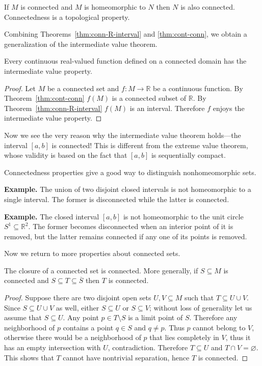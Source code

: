 \begin{cor}
  If $M$ is connected and $M$ is homeomorphic to $N$ then $N$ is also connected.
  Connectedness is a topological property.
\end{cor}

Combining Theorems~\ref{thm:conn-R-interval} and \ref{thm:cont-conn}, we obtain a generalization of the intermediate value theorem.

\begin{cor}
  Every continuous real-valued function defined on a connected domain has the intermediate value property.
\end{cor}

\begin{proof}
  Let $M$ be a connected set and $f: M \to \mathbb{R}$ be a continuous function.
  By Theorem~\ref{thm:cont-conn} $f(M)$ is a connected subset of $\mathbb{R}$.
  By Theorem~\ref{thm:conn-R-interval} $f(M)$ is an interval.
  Therefore $f$ enjoys the intermediate value property.
\end{proof}

Now we see the very reason why the intermediate value theorem holds---the interval $[a,b]$ is connected!
This is different from the extreme value theorem, whose validity is based on the fact that $[a,b]$ is sequentially compact.

Connectedness properties give a good way to distinguish nonhomeomorphic sets.

\noindent\textbf{Example.} The union of two disjoint closed intervals is not homeomorphic to a single interval.
The former is disconnected while the latter is connected.

\medskip
\noindent\textbf{Example.} The closed interval $[a,b]$ is not homeomorphic to the unit circle $S^1 \subseteq \mathbb{R}^2$.
The former becomes disconnected when an interior point of it is removed, but the latter remains connected if any one of its points is removed.

\bigskip
Now we return to more properties about connected sets.

\begin{thm}
  The closure of a connected set is connected.
  More generally, if $S \subseteq M$ is connected and $S \subseteq T \subseteq \overline{S}$ then $T$ is connected.
\end{thm}

\begin{proof}
  Suppose there are two disjoint open sets $U, V \subseteq M$ such that $T \subseteq U \cup V$.
  Since $S \subseteq U \cup V$ as well, either $S \subseteq U$ or $S \subseteq V$; without loss of generality let us assume that $S \subseteq U$.
  Any point $p \in T \setminus S$ is a limit point of $S$.
  Therefore any neighborhood of $p$ contains a point $q \in S$ and $q \ne p$.
  Thus $p$ cannot belong to $V$, otherwise there would be a neighborhood of $p$ that lies completely in $V$, thus it has an empty intersection with $U$, contradiction.  Therefore $T \subseteq U$ and $T \cap V = \varnothing$.
  This shows that $T$ cannot have nontrivial separation, hence $T$ is connected.
\end{proof}

